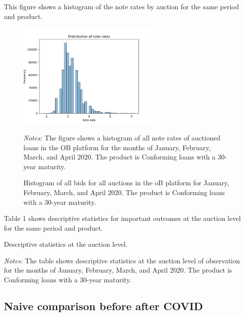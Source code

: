 \documentclass[11pt,a4paper]{article}
\begin{document}
This figure shows a histogram of the note rates by auction for the same period and product.
\begin{figure}[h]
  \centering
  \includegraphics[width=0.62\textwidth]{../results/figures/distribution_of_noterates.png}
  \caption{Histogram of all bids for all auctions in the oB platform for January, February, March, and April 2020. The product is Conforming loans with a 30-year maturity.}
  \begin{minipage}{\textwidth}
      \footnotesize{\textit{Notes:} The figure shows a histogram of all note rates of auctioned loans in the OB platform for the months of January, February, March, and April 2020. The product is Conforming loans with a 30-year maturity. } 
      \end{minipage}
\end{figure}


\pagebreak
Table 1 shows descriptive statistics for important outcomes at the auction level for the same period and product. 


\begin{table}[h]
    \centering
    
    \caption{Descriptive statistics at the auction level. }
    \begin{minipage}{\textwidth}
        \footnotesize{\textit{Notes:} The table shows descriptive statistics at the auction level of observation for the months of January, February, March, and April 2020. The product is Conforming loans with a 30-year maturity. } 
        \end{minipage}
\end{table}


\subsection{Naive comparison before after COVID}
\end{document}
